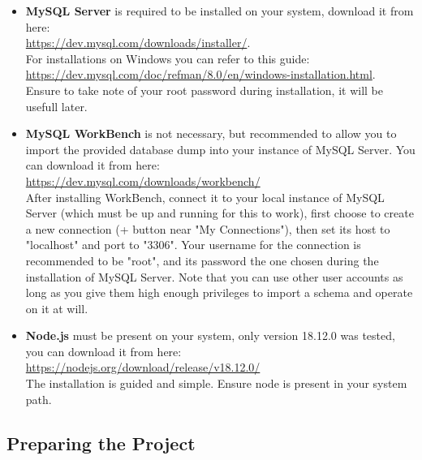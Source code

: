 \documentclass[11pt]{article}
\begin{document}
\begin{itemize}
    \item \textbf{MySQL Server} is required to be installed on your system, download it from here: \\ \href{https://dev.mysql.com/downloads/installer/}{https://dev.mysql.com/downloads/installer/}. \\
    For installations on Windows you can refer to this guide: \\ \href{https://dev.mysql.com/doc/refman/8.0/en/windows-installation.html}{https://dev.mysql.com/doc/refman/8.0/en/windows-installation.html}. \\
    Ensure to take note of your root password during installation, it will be usefull later.
    
    \item \textbf{MySQL WorkBench} is not necessary, but recommended to allow you to import the provided database dump into your instance of MySQL Server. You can download it from here: \\
    \href{https://dev.mysql.com/downloads/workbench/}{https://dev.mysql.com/downloads/workbench/} \\
    After installing WorkBench, connect it to your local instance of MySQL Server (which must be up and running for this to work), first choose to create a new connection (+ button near "My Connections"), then set its host to "localhost" and port to "3306". Your username for the connection is recommended to be "root", and its password the one chosen during the installation of MySQL Server. Note that you can use other user accounts as long as you give them high enough privileges to import a schema and operate on it at will.
    
    \item \textbf{Node.js} must be present on your system, only version 18.12.0 was tested, you can download it from here: \\
    \href{https://nodejs.org/download/release/v18.12.0/}{https://nodejs.org/download/release/v18.12.0/} \\
    The installation is guided and simple. Ensure node is present in your system path.
\end{itemize}

\subsection{Preparing the Project}
\end{document}

